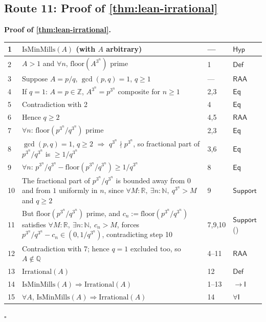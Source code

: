 \documentclass[11pt,reqno]{amsart}
\theoremstyle{blueplain}
\renewcommand{\qedsymbol}{\textcolor{proofqed}{\ensuremath{\square}}}
\renewenvironment{proof}[1][Proof]{\par\noindent\textbf{\textcolor{proofhead}{#1.}}\par\nobreak}{\par\nobreak\hfill\qedsymbol}
\numberwithin{equation}{section}
\begin{document}
\subsection{Route 11: Proof of \cref{thm:lean-irrational}}

\begin{proof}[\textbf{Proof of \cref{thm:lean-irrational}}]
	\label{proof:lean-irrational}
	{\scriptsize
	\begin{tabular}{|m{0.7cm}|m{12cm}|m{1.4cm}|m{2.5cm}|}
		\hline
		1 & $\mathrm{IsMinMills}(A)$ (with $A$ arbitrary) & --- & $\mathsf{Hyp}$ \\ \hline
		2 & $A>1$ and $\forall n$, $\mathrm{floor}(A^{3^{n}})$ prime & 1 & $\mathsf{Def}$ \\ \hline
		3 & Suppose $A=p/q$, $\gcd(p,q)=1$, $q\ge 1$ & --- & $\mathsf{RAA}$ \\ \hline
		4 & If $q=1$: $A=p\in\mathbb{Z}$, $A^{3^{n}}=p^{3^{n}}$ composite for $n\ge 1$ & 2,3 & $\mathsf{Eq}$ \\ \hline
		5 & Contradiction with 2 & 4 & $\mathsf{Eq}$ \\ \hline
		6 & Hence $q\ge 2$ & 4,5 & $\mathsf{RAA}$ \\ \hline
		7 & $\forall n$: $\mathrm{floor}(p^{3^{n}}/q^{3^{n}})$ prime & 2,3 & $\mathsf{Eq}$ \\ \hline
		8 & $\gcd(p,q)=1$, $q\ge 2$ $\Rightarrow$ $q^{3^{n}}\nmid p^{3^{n}}$, so fractional part of $p^{3^{n}}/q^{3^{n}}$ is $\ge 1/q^{3^{n}}$ & 3,6 & $\mathsf{Eq}$ \\ \hline
		9 & $\forall n$: $p^{3^{n}}/q^{3^{n}}-\mathrm{floor}(p^{3^{n}}/q^{3^{n}})\ge 1/q^{3^{n}}$ & 8 & $\mathsf{Eq}$ \\ \hline
		10 & The fractional part of $p^{3^{n}}/q^{3^{n}}$ is bounded away from $0$ and from $1$ uniformly in $n$, since $\forall M:\mathbb{R},\ \exists n:\mathbb{N},\ q^{3^{n}}>M$ and $q\ge 2$ & 9 & $\mathsf{Support}$ \\ \hline
		11 & But $\mathrm{floor}(p^{3^{n}}/q^{3^{n}})$ prime, and $c_n:=\mathrm{floor}(p^{3^{n}}/q^{3^{n}})$ satisfies $\forall M:\mathbb{R},\ \exists n:\mathbb{N},\ c_n>M$, forces $p^{3^{n}}/q^{3^{n}}-c_n\in(0,1/q^{3^{n}})$, contradicting step 10 & 7,9,10 & $\mathsf{Support}$ (\cite{Saito2025}) \\ \hline
		12 & Contradiction with 7; hence $q=1$ excluded too, so $A\notin\mathbb{Q}$ & 4--11 & $\mathsf{RAA}$ \\ \hline
		13 & $\mathrm{Irrational}(A)$ & 12 & $\mathsf{Def}$ \\ \hline
		14 & $\mathrm{IsMinMills}(A)\Rightarrow\mathrm{Irrational}(A)$ & 1--13 & $\rightarrow\mathsf{I}$ \\ \hline
		15 & $\forall A$, $\mathrm{IsMinMills}(A)\Rightarrow\mathrm{Irrational}(A)$ & 14 & $\forall\mathsf{I}$ \\ \hline
	\end{tabular}
	}
\end{proof}
\end{document}
